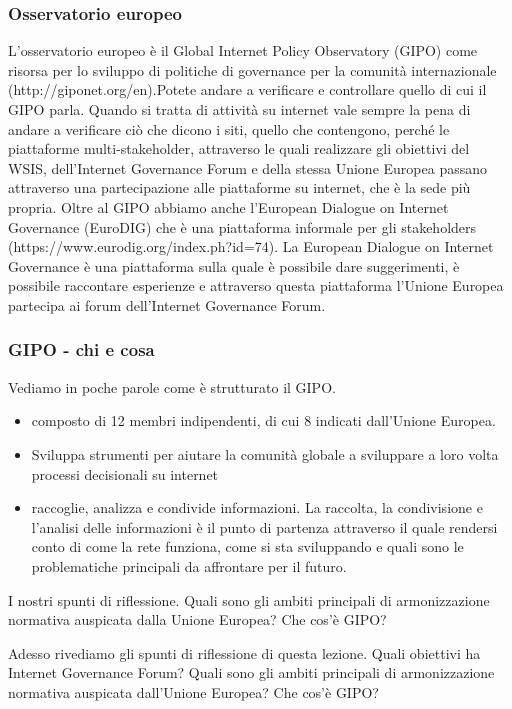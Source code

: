         \subsubsection{Osservatorio europeo}
        L'osservatorio europeo è il Global Internet Policy Observatory (GIPO) come risorsa per lo sviluppo di politiche di governance per la comunità internazionale (http://giponet.org/en).Potete andare a verificare e controllare quello di cui il GIPO parla. Quando si tratta di attività su internet vale sempre la pena di andare a verificare ciò che dicono i siti, quello che contengono, perché le piattaforme multi-stakeholder, attraverso le quali realizzare gli obiettivi del WSIS, dell'Internet Governance Forum e della stessa Unione Europea passano attraverso una partecipazione alle piattaforme su internet, che è la sede più propria. 
        Oltre al GIPO abbiamo anche l'European Dialogue on Internet Governance (EuroDIG) che è una piattaforma informale per gli stakeholders (https://www.eurodig.org/index.ph?id=74). La European Dialogue on Internet Governance è una piattaforma sulla quale è possibile dare suggerimenti, è possibile raccontare esperienze e attraverso questa piattaforma l'Unione Europea partecipa ai forum dell'Internet Governance Forum. 

        \subsubsection{GIPO - chi e cosa}
        Vediamo in poche parole come è strutturato il GIPO. 

        \begin{itemize}
            \item composto di 12 membri indipendenti, di cui 8 indicati dall'Unione Europea.
            \item Sviluppa strumenti per aiutare la comunità globale a sviluppare a loro volta processi decisionali su internet
            \item raccoglie, analizza e condivide informazioni. La raccolta, la condivisione e l'analisi delle informazioni è il punto di partenza attraverso il quale rendersi conto di come la rete funziona, come si sta sviluppando e quali sono le problematiche principali da affrontare per il futuro. 
        \end{itemize}
       
       \par
        I nostri spunti di riflessione. Quali sono gli ambiti principali di armonizzazione normativa auspicata dalla Unione Europea? Che cos'è GIPO? \par 
        Adesso rivediamo gli spunti di riflessione di questa lezione. Quali obiettivi ha Internet Governance Forum? Quali sono gli ambiti principali di armonizzazione normativa auspicata dall'Unione Europea? Che cos'è GIPO?